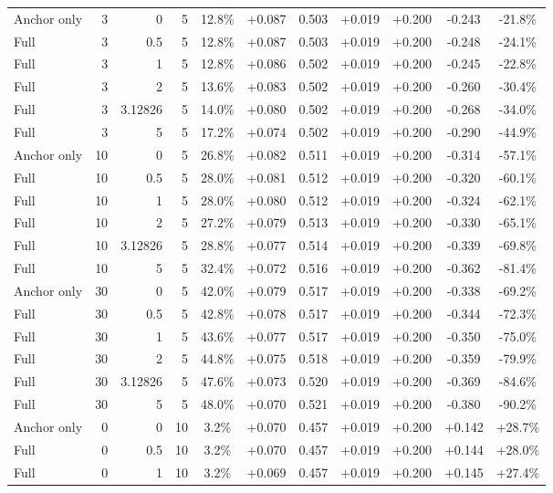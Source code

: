 \begin{table}[htbp]
\begin{tabular}{lrrrccccccc}
Anchor only & 3 & 0 & 5 & 12.8\% & +0.087 & 0.503 & +0.019 & +0.200 & -0.243 & -21.8\% \\
Full & 3 & 0.5 & 5 & 12.8\% & +0.087 & 0.503 & +0.019 & +0.200 & -0.248 & -24.1\% \\
Full & 3 & 1 & 5 & 12.8\% & +0.086 & 0.502 & +0.019 & +0.200 & -0.245 & -22.8\% \\
Full & 3 & 2 & 5 & 13.6\% & +0.083 & 0.502 & +0.019 & +0.200 & -0.260 & -30.4\% \\
Full & 3 & 3.12826 & 5 & 14.0\% & +0.080 & 0.502 & +0.019 & +0.200 & -0.268 & -34.0\% \\
Full & 3 & 5 & 5 & 17.2\% & +0.074 & 0.502 & +0.019 & +0.200 & -0.290 & -44.9\% \\
Anchor only & 10 & 0 & 5 & 26.8\% & +0.082 & 0.511 & +0.019 & +0.200 & -0.314 & -57.1\% \\
Full & 10 & 0.5 & 5 & 28.0\% & +0.081 & 0.512 & +0.019 & +0.200 & -0.320 & -60.1\% \\
Full & 10 & 1 & 5 & 28.0\% & +0.080 & 0.512 & +0.019 & +0.200 & -0.324 & -62.1\% \\
Full & 10 & 2 & 5 & 27.2\% & +0.079 & 0.513 & +0.019 & +0.200 & -0.330 & -65.1\% \\
Full & 10 & 3.12826 & 5 & 28.8\% & +0.077 & 0.514 & +0.019 & +0.200 & -0.339 & -69.8\% \\
Full & 10 & 5 & 5 & 32.4\% & +0.072 & 0.516 & +0.019 & +0.200 & -0.362 & -81.4\% \\
Anchor only & 30 & 0 & 5 & 42.0\% & +0.079 & 0.517 & +0.019 & +0.200 & -0.338 & -69.2\% \\
Full & 30 & 0.5 & 5 & 42.8\% & +0.078 & 0.517 & +0.019 & +0.200 & -0.344 & -72.3\% \\
Full & 30 & 1 & 5 & 43.6\% & +0.077 & 0.517 & +0.019 & +0.200 & -0.350 & -75.0\% \\
Full & 30 & 2 & 5 & 44.8\% & +0.075 & 0.518 & +0.019 & +0.200 & -0.359 & -79.9\% \\
Full & 30 & 3.12826 & 5 & 47.6\% & +0.073 & 0.520 & +0.019 & +0.200 & -0.369 & -84.6\% \\
Full & 30 & 5 & 5 & 48.0\% & +0.070 & 0.521 & +0.019 & +0.200 & -0.380 & -90.2\% \\
Anchor only & 0 & 0 & 10 & 3.2\% & +0.070 & 0.457 & +0.019 & +0.200 & +0.142 & +28.7\% \\
Full & 0 & 0.5 & 10 & 3.2\% & +0.070 & 0.457 & +0.019 & +0.200 & +0.144 & +28.0\% \\
Full & 0 & 1 & 10 & 3.2\% & +0.069 & 0.457 & +0.019 & +0.200 & +0.145 & +27.4\% \\

\end{tabular}
\end{table}
